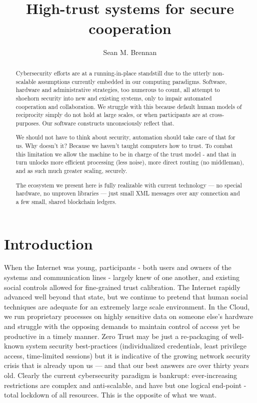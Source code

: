 \documentclass[10pt, twoside]{article}
\title{\textbf{\huge \projectName}\\ High-trust systems for secure cooperation}
\author{Sean M. Brennan}
\date{\monthname{} \the\year}
\begin{document}
	
\TekFiveTitle

\begin{abstract}
	Cybersecurity efforts are at a running-in-place standstill due to the utterly non-scalable assumptions currently embedded in our computing paradigms. Software, hardware and administrative strategies, too numerous to count, all attempt to shoehorn security into new and existing systems, only to impair automated cooperation and collaboration. We struggle with this because default human models of reciprocity simply do not hold at large scales, or when participants are at cross-purposes. Our software constructs unconsciously reflect that. 
	
	We should not have to think about security, automation should take care of that for us. Why doesn't it? Because we haven't taught computers how to trust. To combat this limitation we allow the machine to be in charge of the trust model - and that in turn unlocks more efficient processing (less noise), more direct routing (no middleman), and as such much greater scaling, securely.
		
	The ecosystem we present here is fully realizable with current technology --- no special hardware, no unproven libraries --- just small XML messages over any connection and a few small, shared blockchain ledgers.
\end{abstract}


\section{Introduction} \label{intro}
When the Internet was young, participants - both users and owners of the systems and communication lines - largely knew of one another, and existing social controls allowed for fine-grained trust calibration. The Internet rapidly advanced well beyond that state, but we continue to pretend that human social techniques are adequate for an extremely large scale environment. In the Cloud, we run proprietary processes on highly sensitive data on someone else's hardware and struggle with the opposing demands to maintain control of access yet be productive in a timely manner. Zero Trust may be just a re-packaging of well-known system security best-practices (individualized credentials, least privilege access, time-limited sessions) but it is indicative of the growing network security crisis that is already upon us --- and that our best answers are over thirty years old. Clearly the current cybersecurity paradigm is bankrupt: ever-increasing restrictions are complex and anti-scalable, and have but one logical end-point - total lockdown of all resources. This is the opposite of what we want.
		
\end{document}
